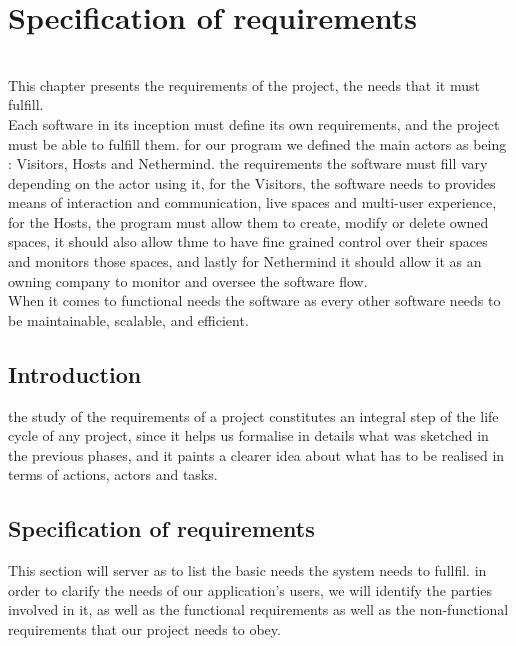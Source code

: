 \chapter{Specification of requirements}%
\label{chap:chapter_two}
\vspace{25pt} {
  \hrulefill \\%
  This chapter presents the requirements of the project, the needs that it must fulfill.\\
  Each software in its inception must define its own requirements, and the project must be able to fulfill them.
  for our program we defined the main actors as being : Visitors, Hosts and Nethermind. 
  the requirements the software must fill vary depending on the actor using it, for the Visitors, the software needs
  to provides means of interaction and communication, live spaces and multi-user experience, for the Hosts, the program
  must allow them to create, modify or delete owned spaces, it should also allow thme to have fine grained control over their spaces
  and monitors those spaces, and lastly for Nethermind it should allow it as an owning company to monitor and oversee the software flow. \\
  When it comes to functional needs the software as every other software needs to be maintainable, scalable, and efficient. 
  \hrulefill\\
}
\pagebreak
\section{\textnormal{Introduction}}
\label{chap:section_one}
    the study of the requirements of a project constitutes an integral step of the life cycle of any project, since it helps us formalise in details what was sketched in the previous phases, and it paints a clearer idea about what has to be realised in terms of actions, actors and tasks.
    
\section{\textnormal{Specification of requirements}}
\label{chap:section_one}
    This section will server as to list the basic needs the system needs to fullfil. in order to clarify the needs of our application's users, we will identify the parties involved in it, as well as the functional requirements as well as the non-functional requirements that our project needs to obey. 
